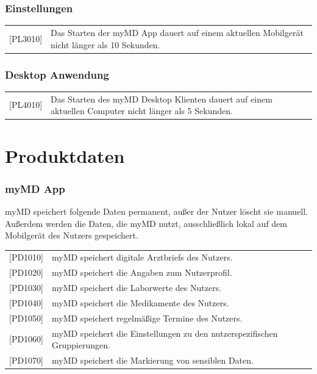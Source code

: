 \documentclass[a4paper]{scrreprt}
\begin{document}
\subsection{Einstellungen}
\begin{tabular}{lll}
[PL3010]&  \multicolumn{2}{p{12cm}}{Das Starten der myMD App dauert auf einem aktuellen Mobilgerät nicht länger als 10 Sekunden.}\\


\end{tabular}

\subsection{\gls{Desktop Anwendung}}
\begin{tabular}{lll}
[PL4010]&  \multicolumn{2}{p{12cm}}{Das Starten des myMD Desktop Klienten dauert auf einem aktuellen Computer nicht länger als 5 Sekunden.}\\

\end{tabular}



\chapter{Produktdaten}
\subsection{myMD \gls{App}}
myMD speichert folgende Daten permanent, außer der \gls{Nutzer} löscht sie manuell. Außerdem werden die Daten, die myMD nutzt, ausschließlich lokal auf dem Mobilgerät des Nutzers gespeichert.
\newline
\newline
\begin{tabular}{lll}
[PD1010]&  \multicolumn{2}{p{12cm}}{myMD speichert digitale \glspl{Arztbrief} des Nutzers.}\\
{[PD1020]} &  \multicolumn{2}{p{12cm}}{myMD speichert die Angaben zum Nutzerprofil.}\\
{[PD1030]} &  \multicolumn{2}{p{12cm}}{myMD speichert die Laborwerte des Nutzers.}\\
{[PD1040]} &  \multicolumn{2}{p{12cm}}{myMD speichert die \gls{Medikament}e des Nutzers.}  \\
{[PD1050]} &  \multicolumn{2}{p{12cm}}{myMD speichert regelmäßige Termine des Nutzers.}  \\
{[PD1060]} &  \multicolumn{2}{p{12cm}}{myMD speichert die Einstellungen zu den nutzerspezifischen Gruppierungen.}  \\
{[PD1070]} &  \multicolumn{2}{p{12cm}}{myMD speichert die Markierung von sensiblen Daten.}  \\

\end{tabular}
\end{document}
